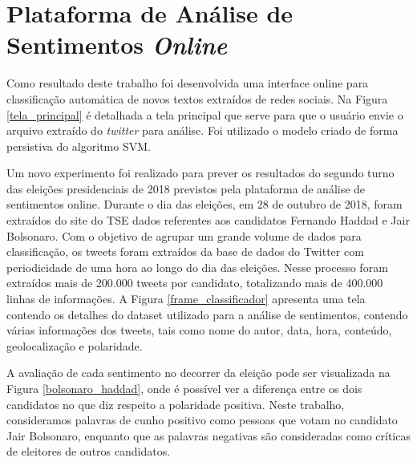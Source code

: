  
 
 
 \section{Plataforma de Análise de Sentimentos \textit{Online}}
 
 Como resultado deste trabalho foi desenvolvida uma interface online para classificação automática de novos textos
 extraídos de redes sociais. Na Figura \ref{tela_principal} é detalhada a tela principal que serve para que o usuário
 envie o arquivo extraído do \textit{twitter} para análise. Foi utilizado o modelo criado de forma persistiva do algoritmo 
 \acrshort{SVM}.
 
 
 
Um novo experimento foi realizado para prever os resultados do segundo turno das eleições presidenciais de 2018 previstos pela plataforma de 
análise de sentimentos online. Durante o dia das eleições, em 28 de outubro de 2018, foram extraídos do site do TSE dados 
referentes aos candidatos Fernando Haddad e Jair Bolsonaro. Com o objetivo de agrupar um grande volume de dados para classificação,
 os tweets foram extraídos da base de dados do Twitter com periodicidade de uma hora ao longo do dia das eleições. 
 Nesse processo foram extraídos mais de 200.000 tweets por candidato, totalizando mais de 400.000 linhas de informações. 
 A Figura \ref{frame_classificador} apresenta uma tela contendo os detalhes do dataset utilizado para a análise de sentimentos,
 contendo várias informações dos tweets, tais como nome do autor, data, hora, conteúdo, geolocalização e polaridade.
 
 
 A avaliação de cada sentimento no decorrer da eleição pode ser visualizada na Figura \ref{bolsonaro_haddad}, onde é possível ver a diferença 
 entre os dois candidatos no que diz respeito a polaridade positiva. Neste trabalho, consideramos palavras de cunho positivo como pessoas que votam 
 no candidato Jair Bolsonaro, enquanto que as palavras negativas são consideradas como críticas de eleitores de outros candidatos.

 
